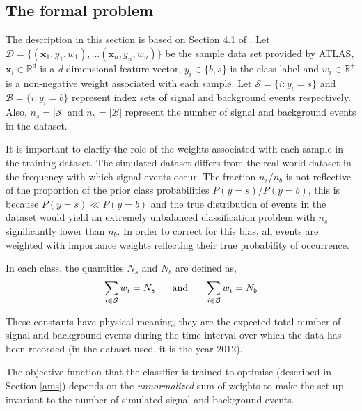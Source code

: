 \documentclass[final,3p,times,twocolumn]{elsarticle}
\begin{document}
\subsection{The formal problem}
\label{math}

The description in this section is based on Section 4.1 of \citep{RM}.
Let $\mathcal{D} = \{(\mathbf{x}_{1},y_{1},w_{1}),...(\mathbf{x}_{n},y_{n},w_{n}) \}$ be the sample data set provided by ATLAS,     $\mathbf{x}_{i} \in \mathbb{R}^d$ is a \textit{d}-dimensional feature vector, $\textit{y}_{i} \in \{b,s\}$ is the class label and $\textit{w}_{i} \in \mathbb{R}^{+}$ is a non-negative weight associated with each sample. Let $\mathcal{S} = \{i : y_{i} = s\}$ and $\mathcal{B} = \{i : y_{i} = b\}$ represent index sets of signal and background events respectively. Also, $n_{s} = |\mathcal{S}|$ and $n_{b} = |\mathcal{B}|$ represent the number of signal and background events in the dataset. 

It is important to clarify the role of the weights associated with each sample in the training dataset. The simulated dataset differs from the real-world dataset in the frequency with which signal events occur. The fraction $n_{s}/n_{b}$ is not reflective of the proportion of the prior class probabilities $P(y = s)/P(y = b)$, this is because $P(y = s) \ll P(y = b)$ and the true distribution of events in the dataset would yield an extremely unbalanced classification problem with $n_{s}$ significantly lower than $n_{b}$.  In order to correct for this bias, all events are weighted with importance weights reflecting their true probability of occurrence.

In each class, the quantities $N_{s}$ and $N_{b}$ are defined as, 
\begin{equation}
\sum_{i \in \mathcal{S}} w_{i} = N_{s} \hspace{5mm} 
\textrm{ and } \hspace{5mm} 
\sum_{i \in \mathcal{B}} w_{i} = N_{b} 
\label{weights}
\end{equation}

These constants have physical meaning, they are the expected total number of signal and background events during the time interval over which the data has been recorded (in the dataset used, it is the year 2012).

The objective function that the classifier is trained to optimise (described in Section \ref{ams}) depends on the \textit{unnormalized} sum of weights to make the set-up invariant to the number of simulated signal and background events.
\end{document}
